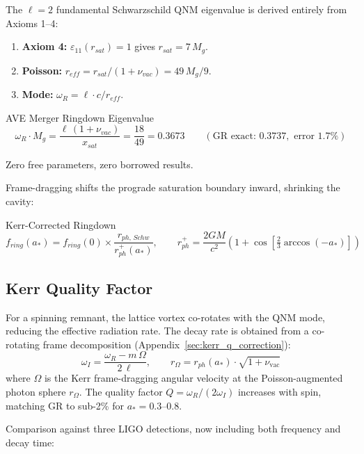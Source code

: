 The $\ell = 2$ fundamental Schwarzschild QNM eigenvalue is derived entirely from Axioms 1--4:
\begin{enumerate}
    \item \textbf{Axiom 4:} $\varepsilon_{11}(r_{sat}) = 1$ gives $r_{sat} = 7\,M_g$.
    \item \textbf{Poisson:} $r_{eff} = r_{sat}/(1 + \nu_{vac}) = 49\,M_g/9$.
    \item \textbf{Mode:} $\omega_R = \ell \cdot c / r_{eff}$.
\end{enumerate}
\begin{resultbox}{AVE Merger Ringdown Eigenvalue}
\begin{equation}
    \omega_R \cdot M_g = \frac{\ell\,(1 + \nu_{vac})}{x_{sat}} = \frac{18}{49} = 0.3673
    \qquad (\text{GR exact: } 0.3737, \text{ error } 1.7\%)
\end{equation}
\end{resultbox}
\noindent Zero free parameters, zero borrowed results.

Frame-dragging shifts the prograde saturation boundary inward, shrinking the cavity:
\begin{resultbox}{Kerr-Corrected Ringdown}
\begin{equation}
    f_{ring}(a_*) = f_{ring}(0) \times \frac{r_{ph,\,Schw}}{r_{ph}^+(a_*)}, \qquad
    r_{ph}^+ = \frac{2GM}{c^2}\left(1 + \cos\!\left[\tfrac{2}{3}\arccos(-a_*)\right]\right)
\end{equation}
\end{resultbox}

\subsection{Kerr Quality Factor}

For a spinning remnant, the lattice vortex co-rotates with the QNM mode, reducing the effective radiation rate.  The decay rate is obtained from a co-rotating frame decomposition (Appendix~\ref{sec:kerr_q_correction}):
\begin{equation}
    \omega_I = \frac{\omega_R - m\,\Omega}{2\,\ell}, \qquad
    r_\Omega = r_{ph}(a_*) \cdot \sqrt{1 + \nu_\mathrm{vac}}
\end{equation}
where $\Omega$ is the Kerr frame-dragging angular velocity at the Poisson-augmented photon sphere $r_\Omega$.  The quality factor $Q = \omega_R / (2\omega_I)$ increases with spin, matching GR to sub-2\% for $a_* = 0.3\textrm{--}0.8$.

\medskip\noindent
Comparison against three LIGO detections, now including both frequency and decay time:

